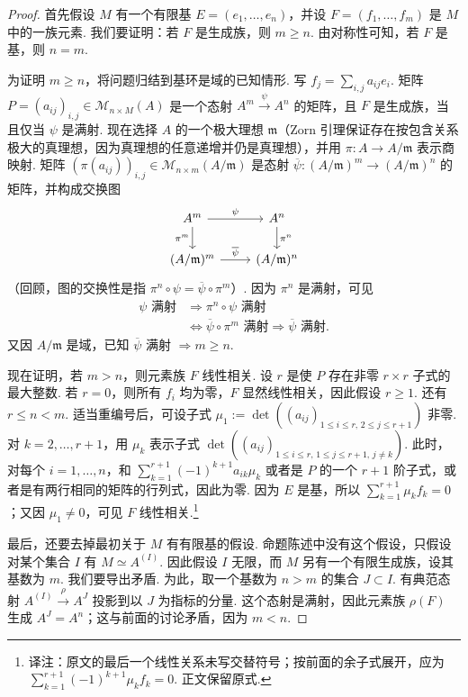 \begin{proof}
首先假设 $M$ 有一个有限基 $E=(e_1,\ldots,e_n)$，并设 $F=(f_1,\ldots,f_m)$ 是 $M$ 中的一族元素. 我们要证明：若 $F$ 是生成族，则 $m\geqslant n$. 由对称性可知，若 $F$ 是基，则 $n=m$.

为证明 $m\geqslant n$，将问题归结到基环是域的已知情形. 写 $f_j=\sum_{i,j}a_{ij}e_i$. 矩阵 $P=(a_{ij})_{i,j}\in\mathcal M_{n\times M}(A)$ 是一个态射 $A^m\xrightarrow{\psi}A^n$ 的矩阵，且 $F$ 是生成族，当且仅当 $\psi$ 是满射. 现在选择 $A$ 的一个极大理想 $\mathfrak m$（Zorn 引理保证存在按包含关系极大的真理想，因为真理想的任意递增并仍是真理想），并用 $\pi\colon A\longrightarrow A/\mathfrak m$ 表示商映射. 矩阵 $(\pi(a_{ij}))_{i,j}\in\mathcal M_{n\times m}(A/\mathfrak m)$ 是态射 $\overline\psi\colon(A/\mathfrak m)^m\longrightarrow(A/\mathfrak m)^n$ 的矩阵，并构成交换图
\[
\begin{tikzcd}
A^m \arrow[r,"\psi"] \arrow[d,"\pi^m"'] & A^n \arrow[d,"\pi^n"] \\
(A/\mathfrak m)^m \arrow[r,"\overline\psi"] & (A/\mathfrak m)^n
\end{tikzcd}
\]
（回顾，图的交换性是指 $\pi^n\circ\psi=\overline\psi\circ\pi^m$）. 因为 $\pi^n$ 是满射，可见
\begin{align*}
\psi\text{ 满射}&\Rightarrow\pi^n\circ\psi\text{ 满射}\\
&\Leftrightarrow\overline\psi\circ\pi^m\text{ 满射}\Rightarrow\overline\psi\text{ 满射}.
\end{align*}
又因 $A/\mathfrak m$ 是域，已知 $\overline\psi$ 满射 $\Rightarrow m\geqslant n$.

现在证明，若 $m>n$，则元素族 $F$ 线性相关. 设 $r$ 是使 $P$ 存在非零 $r\times r$ 子式的最大整数. 若 $r=0$，则所有 $f_i$ 均为零，$F$ 显然线性相关，因此假设 $r\geqslant1$. 还有 $r\leqslant n<m$. 适当重编号后，可设子式 $\mu_1:=\det((a_{ij})_{1\leqslant i\leqslant r,\,2\leqslant j\leqslant r+1})$ 非零. 对 $k=2,\ldots,r+1$，用 $\mu_k$ 表示子式 $\det((a_{ij})_{1\leqslant i\leqslant r,\,1\leqslant j\leqslant r+1,\,j\ne k})$. 此时，对每个 $i=1,\ldots,n$，和 $\sum_{k=1}^{r+1}(-1)^{k+1}a_{ik}\mu_k$ 或者是 $P$ 的一个 $r+1$ 阶子式，或者是有两行相同的矩阵的行列式，因此为零. 因为 $E$ 是基，所以 $\sum_{k=1}^{r+1}\mu_kf_k=0$；又因 $\mu_1\ne0$，可见 $F$ 线性相关.\footnote{译注：原文的最后一个线性关系未写交替符号；按前面的余子式展开，应为 $\sum_{k=1}^{r+1}(-1)^{k+1}\mu_kf_k=0$. 正文保留原式.}

最后，还要去掉最初关于 $M$ 有有限基的假设. 命题陈述中没有这个假设，只假设对某个集合 $I$ 有 $M\simeq A^{(I)}$. 因此假设 $I$ 无限，而 $M$ 另有一个有限生成族，设其基数为 $m$. 我们要导出矛盾. 为此，取一个基数为 $n>m$ 的集合 $J\subset I$. 有典范态射 $A^{(I)}\xrightarrow{\rho}A^J$ 投影到以 $J$ 为指标的分量. 这个态射是满射，因此元素族 $\rho(F)$ 生成 $A^J=A^n$；这与前面的讨论矛盾，因为 $m<n$.
\end{proof}


